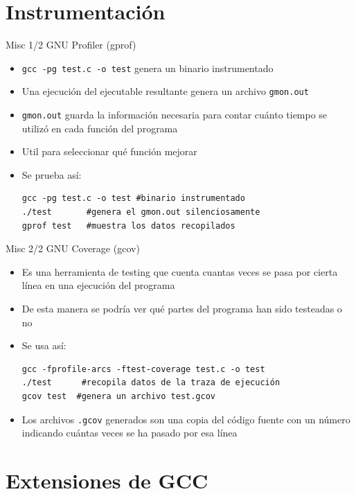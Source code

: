 \documentclass[xetex]{beamer}
\begin{document}
\section{Instrumentación}

\begin{frame}[fragile]{Misc 1/2 GNU Profiler (gprof)}
\begin{itemize}
  \item \verb=gcc -pg test.c -o test= genera un binario instrumentado
  \item Una ejecución del ejecutable resultante genera un archivo \verb=gmon.out=
  \item \verb=gmon.out= guarda la información necesaria para contar cuánto tiempo se utilizó en cada función del programa
  \item Util para seleccionar qué función mejorar
  \item Se prueba así:
\begin{verbatim}
gcc -pg test.c -o test #binario instrumentado
./test       #genera el gmon.out silenciosamente
gprof test   #muestra los datos recopilados
\end{verbatim}
\end{itemize}
\end{frame}

\begin{frame}[fragile]{Misc 2/2 GNU Coverage (gcov)}
  
\begin{itemize}
  \item Es una herramienta de testing que cuenta cuantas veces se pasa por
    cierta línea en una ejecución del programa
  \item De esta manera se podría ver qué partes del programa han sido testeadas o no
  \item Se usa así:
\begin{verbatim}
gcc -fprofile-arcs -ftest-coverage test.c -o test
./test      #recopila datos de la traza de ejecución
gcov test  #genera un archivo test.gcov
\end{verbatim}
  \item Los archivos \verb=.gcov= generados son una copia del código fuente con un
    número indicando cuántas veces se ha pasado por esa línea
\end{itemize}
\end{frame}

\section{Extensiones de GCC}
\end{document}
